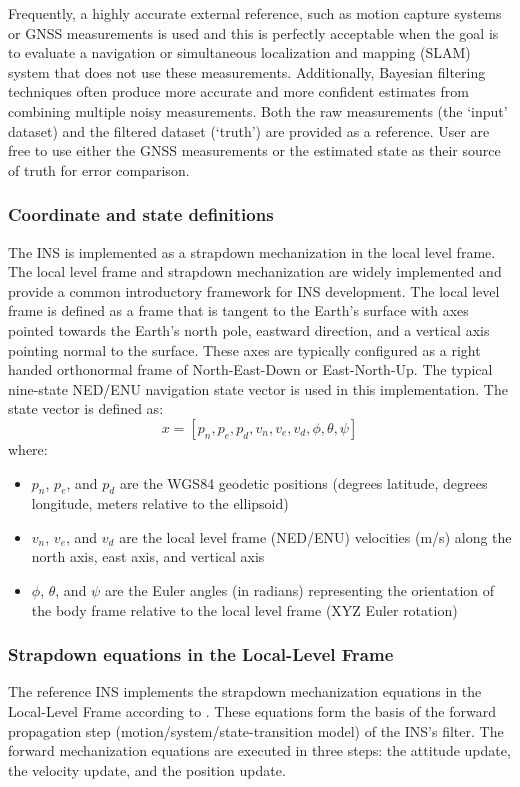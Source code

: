 \documentclass[Afour,sageh,times]{sagej}
\begin{document}
Frequently, a highly accurate external reference, such as motion capture systems or GNSS measurements is used and this is perfectly acceptable when the goal is to evaluate a navigation or simultaneous localization and mapping (SLAM) system that does not use these measurements. Additionally, Bayesian filtering techniques often produce more accurate and more confident estimates from combining multiple noisy measurements. Both the raw measurements (the `input' dataset) and the filtered dataset (`truth') are provided as a reference. User are free to use either the GNSS measurements or the estimated state as their source of truth for error comparison.

\subsubsection{Coordinate and state definitions}
The INS is implemented as a strapdown mechanization in the local level frame. The local level frame and strapdown mechanization are widely implemented and provide a common introductory framework for INS development. The local level frame is defined as a frame that is tangent to the Earth's surface with axes pointed towards the Earth's north pole, eastward direction, and a vertical axis pointing normal to the surface. These axes are typically configured as a right handed orthonormal frame of North-East-Down or East-North-Up. The typical nine-state NED/ENU navigation state vector is used in this implementation. The state vector is defined as:
\[
x = \left[p_n, p_e, p_d, v_n, v_e, v_d, \phi, \theta, \psi \right] 
\]
where: \begin{itemize}
  \item \(p_n\), \(p_e\), and \(p_d\) are the WGS84 geodetic positions (degrees latitude, degrees longitude, meters relative to the ellipsoid)
  \item \(v_n\), \(v_e\), and \(v_d\) are the local level frame (NED/ENU) velocities (m/s) along the north axis, east axis, and vertical axis 
  \item \(\phi\), \(\theta\), and \(\psi\) are the Euler angles (in radians) representing the orientation of the body frame relative to the local level frame (XYZ Euler rotation)
\end{itemize}

\subsubsection{Strapdown equations in the Local-Level Frame}
The reference INS implements the strapdown mechanization equations in the Local-Level Frame according to \cite{groves}. These equations form the basis of the forward propagation step (motion/system/state-transition model) of the INS's filter. The forward mechanization equations are executed in three steps: the attitude update, the velocity update, and the position update. 
\end{document}
